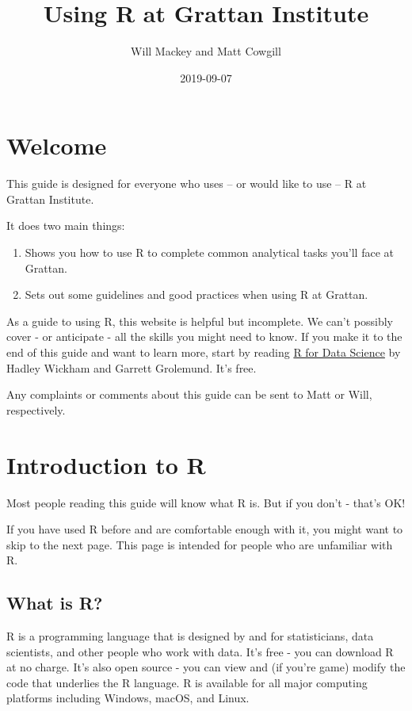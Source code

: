 \documentclass[]{book}
\title{Using R at Grattan Institute}
\author{Will Mackey and Matt Cowgill}
\date{2019-09-07}
\providecommand{\tightlist}{%
  \setlength{\itemsep}{0pt}\setlength{\parskip}{0pt}}
\begin{document}
\maketitle

{
\setcounter{tocdepth}{1}
\tableofcontents
}
\hypertarget{welcome}{%
\chapter*{Welcome}\label{welcome}}

This guide is designed for everyone who uses -- or would like to use -- R at Grattan Institute.

It does two main things:

\begin{enumerate}
\def\labelenumi{\arabic{enumi}.}
\tightlist
\item
  Shows you how to use R to complete common analytical tasks you'll face at Grattan.
\item
  Sets out some guidelines and good practices when using R at Grattan.
\end{enumerate}

As a guide to using R, this website is helpful but incomplete. We can't possibly cover - or anticipate - all the skills you might need to know. If you make it to the end of this guide and want to learn more, start by reading \href{https://r4ds.had.co.nz}{R for Data Science} by Hadley Wickham and Garrett Grolemund. It's free.

Any complaints or comments about this guide can be sent to Matt or Will, respectively.

\hypertarget{introduction-to-r}{%
\chapter{Introduction to R}\label{introduction-to-r}}

Most people reading this guide will know what R is. But if you don't - that's OK!

If you have used R before and are comfortable enough with it, you might want to skip to the next page. This page is intended for people who are unfamiliar with R.

\hypertarget{what-is-r}{%
\section{What is R?}\label{what-is-r}}

R is a programming language that is designed by and for statisticians, data scientists, and other people who work with data. It's free - you can download R at no charge. It's also open source - you can view and (if you're game) modify the code that underlies the R language. R is available for all major computing platforms including Windows, macOS, and Linux.
\end{document}
